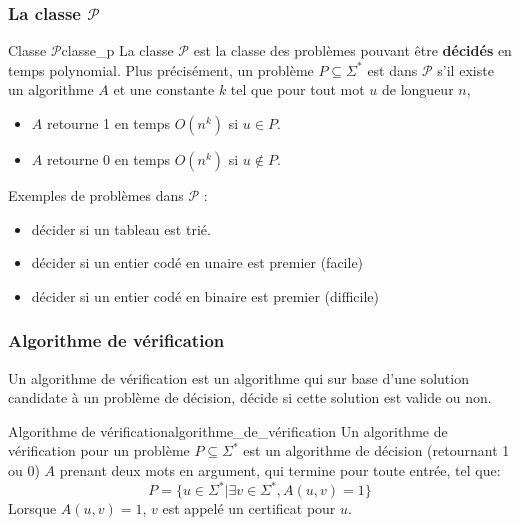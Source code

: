 \subsubsection{La classe $\mathcal{P}$}
\label{sub:la_classe_p}
\begin{definition}{Classe $\mathcal{P}$}{classe_p}
    La classe $\mathcal{P}$ est la classe des problèmes pouvant être \textbf{décidés} en temps polynomial. Plus précisément,
    un problème $P\subseteq\Sigma^*$ est dans $\mathcal{P}$ s'il existe un algorithme $A$ et une constante $k$ tel que
    pour tout mot $u$ de longueur $n$,
    \begin{itemize}[label=\textbullet]
        \item $A$ retourne 1 en temps $O(n^k)$ si $u\in P$.
        \item $A$ retourne 0 en temps $O(n^k)$ si $u\notin P$.
    \end{itemize}
\end{definition}
\begin{example}
    Exemples de problèmes dans $\mathcal{P}$ :
    \begin{itemize}[label=\textbullet]
        \item décider si un tableau est trié.
        \item décider si un entier codé en unaire est premier (facile)
        \item décider si un entier codé en binaire est premier (difficile)
    \end{itemize}
\end{example}


\subsubsection{Algorithme de vérification}
\label{sub:algorithme_de_verification}
Un algorithme de vérification est un algorithme qui sur base d'une solution candidate à un problème de décision, décide si
cette solution est valide ou non.
\begin{definition}{Algorithme de vérification}{algorithme_de_vérification}
    Un algorithme de vérification pour un problème $P\subseteq\Sigma^*$ est un algorithme de décision (retournant 1 ou 0)
    $A$ prenant deux mots en argument, qui termine pour toute entrée, tel que:
    \begin{equation*}
        P = \{u\in\Sigma^* | \exists v \in \Sigma^*, A(u,v)=1\}
    \end{equation*}
    Lorsque $A(u,v)=1$, $v$ est appelé un certificat pour $u$.
\end{definition}

